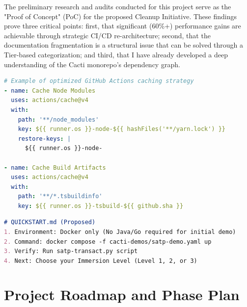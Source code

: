 The preliminary research and audits conducted for this project serve as the "Proof of Concept" (PoC) for the proposed Cleanup Initiative. These findings prove three critical points: first, that significant (60\%+) performance gains are achievable through strategic CI/CD re-architecture; second, that the documentation fragmentation is a structural issue that can be solved through a Tier-based categorization; and third, that I have already developed a deep understanding of the Cacti monorepo's dependency graph.

\begin{tcolorbox}[colback=gray!5!white, colframe=gray!50!black,
  title=Optimized CI/CD Strategy: Parallel Caching,
  fonttitle=\bfseries, arc=4pt]
\begin{lstlisting}[language=yaml, basicstyle=\ttfamily\footnotesize]
# Example of optimized GitHub Actions caching strategy
- name: Cache Node Modules
  uses: actions/cache@v4
  with:
    path: '**/node_modules'
    key: ${{ runner.os }}-node-${{ hashFiles('**/yarn.lock') }}
    restore-keys: |
      ${{ runner.os }}-node-

- name: Cache Build Artifacts
  uses: actions/cache@v4
  with:
    path: '**/*.tsbuildinfo'
    key: ${{ runner.os }}-tsbuild-${{ github.sha }}
\end{lstlisting}
\end{tcolorbox}

\begin{tcolorbox}[colback=gray!5!white, colframe=gray!50!black,
  title=Proposed Unified Onboarding Structure,
  fonttitle=\bfseries, arc=4pt]
\begin{lstlisting}[language=markdown, basicstyle=\ttfamily\footnotesize]
# QUICKSTART.md (Proposed)
1. Environment: Docker only (No Java/Go required for initial demo)
2. Command: docker compose -f cacti-demos/satp-demo.yaml up
3. Verify: Run satp-transact.py script
4. Next: Choose your Immersion Level (Level 1, 2, or 3)
\end{lstlisting}
\end{tcolorbox}

\section{Project Roadmap and Phase Plan}

